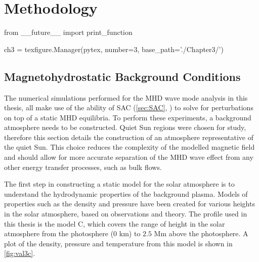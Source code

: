 \chapter{Methodology}\label{ch:methodology}  %

\begin{pycode}[chapter3]
from __future__ import print_function

ch3 = texfigure.Manager(pytex, number=3, base_path='./Chapter3/')
\end{pycode}

\section{Magnetohydrostatic Background Conditions}\label{sec:mhsbackground}

The numerical simulations performed for the MHD wave mode analysis in this thesis, all make use of the ability of SAC (\cref{sec:SAC}, \cite{shelyag2008}) to solve for perturbations on top of a static MHD equilibria.
To perform these experiments, a background atmosphere needs to be constructed.
Quiet Sun regions were chosen for study, therefore this section details the construction of an atmosphere representative of the quiet Sun.
This choice reduces the complexity of the modelled magnetic field and should allow for more accurate separation of the MHD wave effect from any other energy transfer processes, such as bulk flows.

The first step in constructing a static model for the solar atmosphere is to understand the hydrodynamic properties of the background plasma.
Models of properties such as the density and pressure have been created for various heights in the solar atmosphere, based on observations and theory.
The profile used in this thesis is the \cite{vernazza1981} model C, which covers the range of height in the solar atmosphere from the photosphere ($0$ km) to $2.5$ Mm above the photosphere.
A plot of the density, pressure and temperature from this model is shown in \cref{fig:val3c}.

